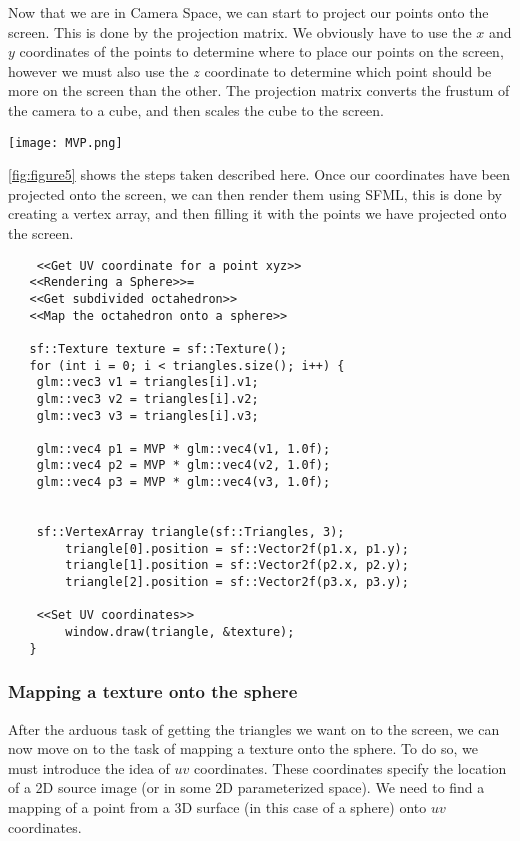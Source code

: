 \documentclass[main.tex]{subfiles}
\begin{document}
Now that we are in Camera Space, we can start to project our points onto the screen. This is done by the projection matrix.
We obviously have to use the $x$ and $y$ coordinates of the points to determine where to place our points on the screen, however 
we must also use the $z$ coordinate to determine which point should be more on the screen than the other.
The projection matrix converts the frustum of the camera to a cube, and then scales the cube to the screen.
\begin{figure*}\texttt{[image: MVP.png]}\caption{shows the steps taken to get screen coordinates}\label{fig:figure5}\end{figure*}
\ref{fig:figure5} shows the steps taken described here.
Once our coordinates have been projected onto the screen, we can then render them using SFML\@, this is done by creating a vertex array, and then
filling it with the points we have projected onto the screen.
\begin{lstlisting}
    <<Get UV coordinate for a point xyz>>
   <<Rendering a Sphere>>=
   <<Get subdivided octahedron>>
   <<Map the octahedron onto a sphere>>

   sf::Texture texture = sf::Texture();
   for (int i = 0; i < triangles.size(); i++) {
    glm::vec3 v1 = triangles[i].v1;
    glm::vec3 v2 = triangles[i].v2;
    glm::vec3 v3 = triangles[i].v3;
    
    glm::vec4 p1 = MVP * glm::vec4(v1, 1.0f);
    glm::vec4 p2 = MVP * glm::vec4(v2, 1.0f);
    glm::vec4 p3 = MVP * glm::vec4(v3, 1.0f);


    sf::VertexArray triangle(sf::Triangles, 3);
        triangle[0].position = sf::Vector2f(p1.x, p1.y);
        triangle[1].position = sf::Vector2f(p2.x, p2.y);
        triangle[2].position = sf::Vector2f(p3.x, p3.y);

    <<Set UV coordinates>>
        window.draw(triangle, &texture);
   }
\end{lstlisting}

\subsubsection{Mapping a texture onto the sphere}
After the arduous task of getting the triangles we want on to the screen, we can now move on to the task of mapping a texture onto the sphere. 
To do so, we must introduce the idea of $uv$ coordinates. These coordinates specify the location of a 2D source image (or in some 2D parameterized space).
We need to find a mapping of a point from a 3D surface (in this case of a sphere) onto $uv$ coordinates.
\end{document}
